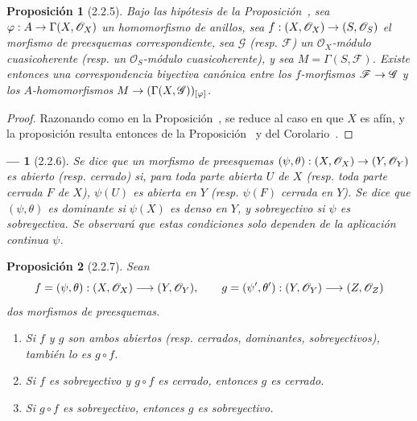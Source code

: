 \documentclass[oneside]{amsart}
\theoremstyle{ega-env-style}
\newtheorem*{env}{---}
\theoremstyle{ega-thm-env-style}
\newtheorem*{proposition}{Proposición}
\theoremstyle{ega-defn-env-style}
\renewcommand{\to}{\mathchoice{\longrightarrow}{\rightarrow}{\rightarrow}{\rightarrow}}
\newcommand{\oldpage}[2][]{{\marginnote{\normalfont{\textbf{#1}~|~#2}}}\ignorespaces}
\let\EGAOriginalLabel\label
\renewcommand{\label}[1]{\phantomsection\EGAOriginalLabel{#1}}
\begin{document}
\begin{proposition}[2.2.5]
\label{I.2.2.5}
Bajo las hipótesis de la Proposición~, sea $\varphi:A\to\Gamma(X,\mathscr{O}_X)$ un homomorfismo de anillos, sea $f:(X,\mathscr{O}_X)\to(S,\mathscr{O}_S)$ el morfismo de preesquemas correspondiente, sea $\mathscr{G}$ \textup{(resp. $\mathscr{F}$)} un $\mathscr{O}_X$-módulo cuasicoherente \textup{(resp.} un $\mathscr{O}_S$-módulo cuasicoherente), y sea $M=\Gamma(S,\mathscr{F})$.
Existe entonces una correspondencia biyectiva canónica
\oldpage[I]{100}
entre los $f$-morfismos $\mathscr{F}\to\mathscr{G}$  y los $A$-homomorfismos $M\to(\Gamma(X,\mathscr{G}))_{[\varphi]}$.
\end{proposition}

\begin{proof}
Razonando como en la Proposición~, se reduce al caso en que $X$ es afín, y la proposición resulta entonces de la Proposición~ y del Corolario~.
\end{proof}

\begin{env}[2.2.6]
\label{I.2.2.6}
Se dice que un morfismo de preesquemas $(\psi,\theta):(X,\mathscr{O}_X)\to(Y,\mathscr{O}_Y)$ es \emph{abierto} (resp. \emph{cerrado}) si, para toda parte abierta $U$ de $X$ (resp. toda parte cerrada $F$ de $X$), $\psi(U)$ es abierta en $Y$ (resp. $\psi(F)$ cerrada en $Y$).
Se dice que $(\psi,\theta)$ es \emph{dominante} si $\psi(X)$ es denso en $Y$, y \emph{sobreyectivo} si $\psi$ es sobreyectiva.
Se observará que estas condiciones solo dependen de la aplicación continua $\psi$.
\end{env}

\begin{proposition}[2.2.7]
\label{I.2.2.7}
Sean
\[
  f=(\psi,\theta):(X,\mathscr{O}_X)\to(Y,\mathscr{O}_Y),
  \qquad
  g=(\psi',\theta'):(Y,\mathscr{O}_Y)\to(Z,\mathscr{O}_Z)
\]
dos morfismos de preesquemas.
\begin{enumerate}
  \item[{\rm(i)}] Si $f$ y $g$ son ambos abiertos \textup{(resp.} cerrados, dominantes, sobreyectivos),
    también lo es $g\circ f$.
  \item[{\rm(ii)}] Si $f$ es sobreyectivo y $g\circ f$ es cerrado, entonces $g$ es cerrado.
  \item[{\rm(iii)}] Si $g\circ f$ es sobreyectivo, entonces $g$ es sobreyectivo.
\end{enumerate}
\end{proposition}
\end{document}
